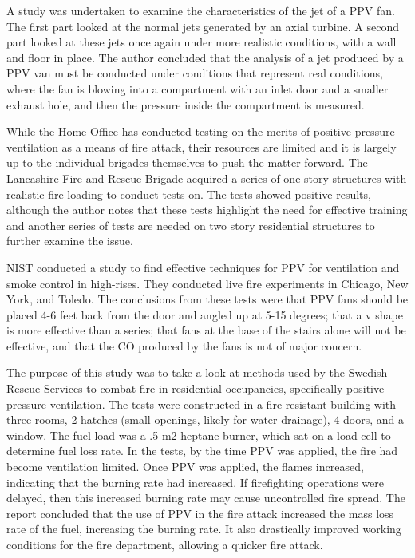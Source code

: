 \documentclass{article}
\begin{document}
\begin{appendices}
A study was undertaken to examine the characteristics of the jet of a PPV fan. The first part looked at the normal jets generated by an axial turbine. A second part looked at these jets once again under more realistic conditions, with a wall and floor in place. The author concluded that the analysis of a jet produced by a PPV van must be conducted under conditions that represent real conditions, where the fan is blowing into a compartment with an inlet door and a smaller exhaust hole, and then the pressure inside the compartment is measured.\cite{AxialTurbine}
	
While the Home Office has conducted testing on the merits of positive pressure ventilation as a means of fire attack, their resources are limited and it is largely up to the individual brigades themselves to push the matter forward. The Lancashire Fire and Rescue Brigade acquired a series of one story structures with realistic fire loading to conduct tests on. The tests showed positive results, although the author notes that these tests highlight the need for effective training and another series of tests are needed on two story residential structures to further examine the issue.\cite{StottSingleStory}
	
NIST conducted a study to find effective techniques for PPV for ventilation and smoke control in high-rises. They conducted live fire experiments in Chicago, New York, and Toledo. The conclusions from these tests were that PPV fans should be placed 4-6 feet back from the door and angled up at 5-15 degrees; that a v shape is more effective than a series; that fans at the base of the stairs alone will not be effective, and that the CO produced by the fans is not of major concern.\cite{KerberWorldSafety}
	
The purpose of this study was to take a look at methods used by the Swedish Rescue Services to combat fire in residential occupancies, specifically positive pressure ventilation. The tests were constructed in a fire-resistant building with three rooms, 2 hatches (small openings, likely for water drainage), 4 doors, and a window. The fuel load was a .5 m2 heptane burner, which sat on a load cell to determine fuel loss rate. In the tests, by the time PPV was applied, the fire had become ventilation limited. Once PPV was applied, the flames increased, indicating that the burning rate had increased. If firefighting operations were delayed, then this increased burning rate may cause uncontrolled fire spread. The report concluded that the use of PPV in the fire attack increased the mass loss rate of the fuel, increasing the burning rate. It also drastically improved working conditions for the fire department, allowing a quicker fire attack.\cite{SvenssonVentFFOps}
	

\end{appendices}
\end{document}
